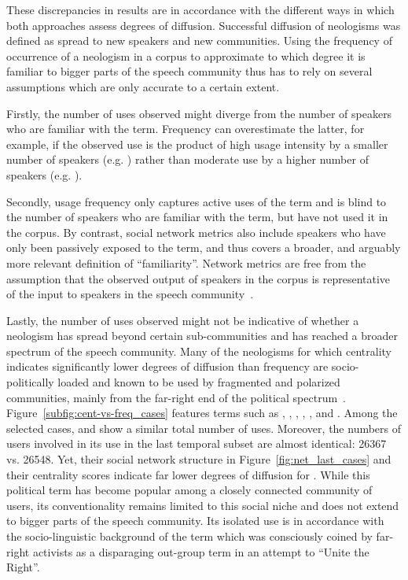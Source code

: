 \documentclass[
  a4paper,
  abstract=on,
  captions=tableabove
  ]{scrartcl}
\begin{document}

    These discrepancies in results are in accordance with the different ways in which both approaches assess degrees of diffusion. Successful diffusion of neologisms was defined as spread to new speakers and new communities. Using the frequency of occurrence of a neologism in a corpus to approximate to which degree it is familiar to bigger parts of the speech community thus has to rely on several assumptions which are only accurate to a certain extent.

    Firstly, the number of uses observed might diverge from the number of speakers who are familiar with the term. Frequency can overestimate the latter, for example, if the observed use is the product of high usage intensity by a smaller number of speakers (e.g. ) rather than moderate use by a higher number of speakers (e.g. ).

    Secondly, usage frequency only captures active uses of the term and is blind to the number of speakers who are familiar with the term, but have not used it in the corpus. By contrast, social network metrics also include speakers who have only been passively exposed to the term, and thus covers a broader, and arguably more relevant definition of \enquote{familiarity}. Network metrics are free from the assumption that the observed output of speakers in the corpus is representative of the input to speakers in the speech community~\parencite{Stefanowitsch2017CorpusbasedPerspective}.

    Lastly, the number of uses observed might not be indicative of whether a neologism has spread beyond certain sub-communities and has reached a broader spectrum of the speech community. Many of the neologisms for which centrality indicates significantly lower degrees of diffusion than frequency are socio-politically loaded and known to be used by fragmented and polarized communities, mainly from the far-right end of the political spectrum~\parencite{Sunstein2018RepublicDivided}. Figure~\ref{subfig:cent-vs-freq_cases} features terms such as , , , , , and . Among the selected cases,  and  show a similar total number of uses. Moreover, the numbers of users involved in its use in the last temporal subset are almost identical: \num{26367} vs. \num{26548}. Yet, their social network structure in Figure~\ref{fig:net_last_cases} and their centrality scores indicate far lower degrees of diffusion for . While this political term has become popular among a closely connected community of users, its conventionality remains limited to this social niche and does not extend to bigger parts of the speech community. Its isolated use is in accordance with the socio-linguistic background of the term which was consciously coined by far-right activists as a disparaging out-group term in an attempt to \enquote{Unite the Right}.
\end{document}

